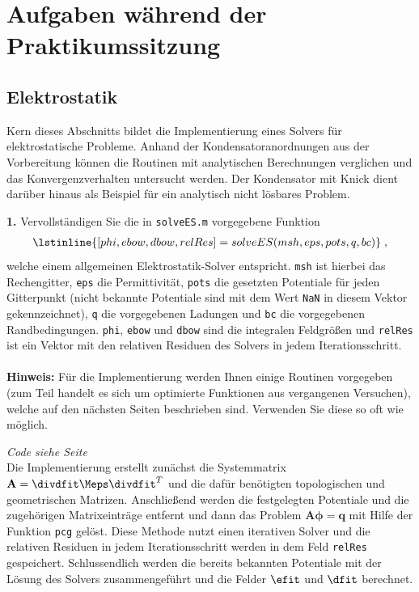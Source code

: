 \documentclass[./Protokollheft.tex]{subfiles}
\begin{document}
\section{Aufgaben während der Praktikumssitzung}

{\subsection{Elektrostatik}}

Kern dieses Abschnitts bildet die Implementierung eines Solvers für elektrostatische
Probleme. Anhand der Kondensatoranordnungen aus der Vorbereitung können die
Routinen mit analytischen Berechnungen verglichen und das Konvergenzverhalten
untersucht werden. Der Kondensator mit Knick dient darüber hinaus als Beispiel
für ein analytisch nicht lösbares Problem.

\begin{framed}
	 \label{v4.PA.1}
	\noindent \textbf{1.} Vervollständigen Sie die in \lstinline{solveES.m} vorgegebene Funktion
\begin{align}
\lstinline{[phi, ebow, dbow, relRes] = solveES(msh, eps, pots, q, bc)} \; ,
\end{align}
welche einem allgemeinen Elektrostatik-Solver entspricht. \lstinline{msh} ist hierbei das Rechengitter, \lstinline{eps} die Permittivität, \lstinline{pots} die gesetzten Potentiale für jeden Gitterpunkt (nicht bekannte Potentiale sind mit dem Wert \lstinline{NaN} in diesem Vektor gekennzeichnet), \lstinline{q} die vorgegebenen Ladungen und \lstinline{bc} die vorgegebenen Randbedingungen. \lstinline{phi}, \lstinline{ebow} und \lstinline{dbow} sind die integralen Feldgrößen und \lstinline{relRes} ist ein Vektor mit den relativen Residuen des Solvers in jedem Iterationsschritt.\\
\ \\
{\textbf{Hinweis:}} Für die Implementierung werden Ihnen einige Routinen vorgegeben
(zum Teil handelt es sich um optimierte Funktionen aus vergangenen Versuchen), welche auf den nächsten Seiten beschrieben sind. Verwenden Sie diese so oft wie möglich.\label{exer:solveES}
\end{framed}


\textit{ Code siehe Seite \pageref{code4.1} } \\
Die Implementierung erstellt zunächst die Systemmatrix $\mathbf{A} = \mathbf{\divdfit}\mathbf{\Meps}\mathbf{\divdfit}^T$ und die dafür benötigten topologischen und geometrischen Matrizen. Anschließend werden die festgelegten Potentiale und die zugehörigen Matrixeinträge entfernt und dann das Problem $\mathbf{A}\mathbf{\phi} = \mathbf{q}$ mit Hilfe der Funktion \lstinline{pcg} gelöst.
Diese Methode nutzt einen iterativen Solver und die relativen Residuen in jedem Iterationsschritt werden in dem Feld \lstinline{relRes} gespeichert. Schlussendlich werden die bereits bekannten Potentiale mit der Lösung des Solvers zusammengeführt und die Felder $\efit$ und $\dfit$ berechnet.
\end{document}
